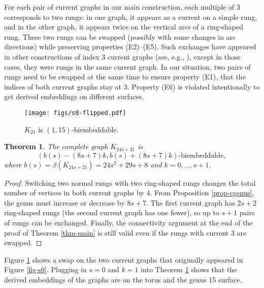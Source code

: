 \documentclass[12pt]{article}
\theoremstyle{plain}
\newtheorem{theorem}{Theorem}[section]
\begin{document}
For each pair of current graphs in our main construction, each multiple of 3 corresponds to two rungs: in one graph, it appears as a current on a simple rung, and in the other graph, it appears twice on the vertical arcs of a ring-shaped rung. These two rungs can be swapped (possibly with some changes in arc directions) while preserving properties (E2)--(E5). Such exchanges have appeared in other constructions of index 3 current graphs (see, e.g., \cite{JungermanRingel-Minimal,Sun-Minimum}), except in those cases, they were rungs in the same current graph. In our situation, two pairs of rungs need to be swapped at the same time to ensure property (E1), that the indices of both current graphs stay at 3. Property (E6) is violated intentionally to get derived embeddings on different surfaces. 

\begin{figure}[!t]
\centering
\texttt{[image: figs/s0-flipped.pdf]}
\caption{$K_{21}$ is $(1,15)$-biembeddable.}
\label{fig-flipped}
\end{figure}


\begin{theorem}
The complete graph $K_{24s+21}$ is $$(b(s)-(8s+7)k, b(s)+(8s+7)k)\text{-biembeddable},$$ where $b(s) = \beta(K_{24s+21}) = 24s^2+29s+8$ and $k = 0, \dotsc, s+1$. 
\label{thm-swap}
\end{theorem}
\begin{proof}
Switching two normal rungs with two ring-shaped rungs changes the total number of vertices in both current graphs by $4$. From Proposition \ref{prop-cgenus}, the genus must increase or decrease by $8s+7$. The first current graph has $2s+2$ ring-shaped rungs (the second current graph has one fewer), so up to $s+1$ pairs of rungs can be exchanged. Finally, the connectivity argument at the end of the proof of Theorem \ref{thm-main} is still valid even if the rungs with current 3 are swapped.
\end{proof}

Figure \ref{fig-flipped} shows a swap on the two current graphs that originally appeared in Figure \ref{fig-s0}. Plugging in $s = 0$ and $k = 1$ into Theorem \ref{thm-swap} shows that the derived embeddings of the graphs are on the torus and the genus 15 surface. 




\newpage
\end{document}
